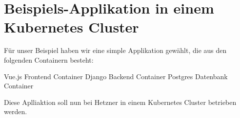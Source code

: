 \section{Beispiels-Applikation in einem Kubernetes Cluster}
Für unser Beispiel haben wir eine simple Applikation gewählt, die aus den folgenden Containern besteht:

Vue.js Frontend Container
Django Backend Container
Postgres Datenbank Container

Diese Aplliaktion soll nun bei Hetzner in einem Kubernetes Cluster betrieben werden.
\clearpage
